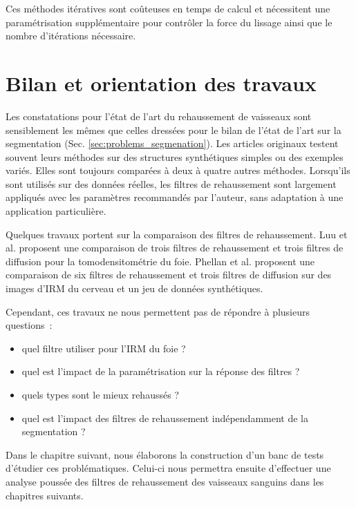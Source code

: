 Ces méthodes itératives sont coûteuses en temps de calcul et nécessitent une paramétrisation supplémentaire pour contrôler la force du lissage ainsi que le nombre d'itérations nécessaire.

\section{Bilan et orientation des travaux}
\label{sec:EA:bilan}

Les constatations pour l'état de l'art du rehaussement de vaisseaux sont sensiblement les mêmes que celles dressées pour le bilan de l'état de l'art sur la segmentation (Sec. \ref{sec:problems_segmenation}). Les articles originaux testent souvent leurs méthodes sur des structures synthétiques simples ou des exemples variés. Elles sont toujours comparées à deux à quatre autres méthodes. Lorsqu'ils sont utilisés sur des données réelles, les filtres de rehaussement sont largement appliqués avec les paramètres recommandés par l'auteur, sans adaptation à une application particulière.

Quelques travaux portent sur la comparaison des filtres de rehaussement. Luu et al. \cite{Luu2015_liver_vesselness_comparison} proposent une comparaison de trois filtres de rehaussement et trois filtres de diffusion pour la tomodensitométrie du foie. Phellan et al. \cite{Phellan2017_Brain_vesselness_comparison} proposent une comparaison de six filtres de rehaussement et trois filtres de diffusion sur des images d'IRM du cerveau et un jeu de données synthétiques.

Cependant, ces travaux ne nous permettent pas de répondre à plusieurs questions~:

\begin{itemize}
\item quel filtre utiliser pour l'IRM du foie ?
\item quel est l'impact de la paramétrisation sur la réponse des filtres ?
\item quels types  sont le mieux rehaussés ?
\item quel est l'impact des filtres de rehaussement indépendamment de la segmentation ?
\end{itemize}

Dans le chapitre suivant, nous élaborons la construction d'un banc de tests d'étudier ces problématiques. Celui-ci nous permettra ensuite d'effectuer une analyse poussée des filtres de rehaussement des vaisseaux sanguins dans les chapitres suivants.








